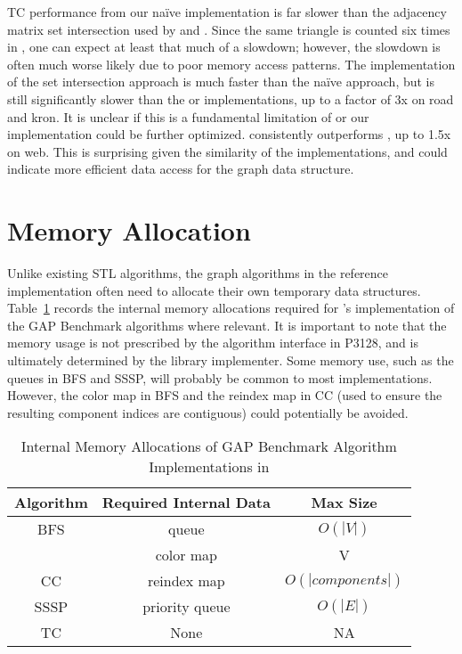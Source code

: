 TC performance from our na\"ive \bgl implementation
is far slower than the adjacency matrix set intersection used by \nwgraph
and \stdgraph.
Since the same triangle is counted six times in \bgl,
one can expect at least that much of a slowdown; however, the slowdown
is often much worse likely due to poor memory access patterns.
The \bgl implementation of the set intersection approach is much faster
than the na\"ive approach, but is still significantly slower than the
\nwgraph or \stdgraph implementations, up to a factor of 3x on road and kron.
It is unclear if this is a fundamental limitation of \bgl or our implementation could be
further optimized.
\stdgraph consistently outperforms \nwgraph, up to 1.5x on web.
This is surprising given the similarity of the implementations, and could indicate more
efficient data access for the \stdgraph graph data structure.

\section{Memory Allocation}

Unlike existing STL algorithms, the graph algorithms in the \stdgraph reference
implementation often need to allocate their own temporary data structures.
Table~\ref{tab:internalmem} records the internal memory allocations
required for \stdgraph's implementation of the GAP Benchmark algorithms
where relevant.
It is important to note that the memory usage is not prescribed
by the algorithm interface in P3128, and is ultimately determined by the
library implementer.
Some memory use, such as the queues in BFS and SSSP, will
probably be common to most implementations.
However, the color map in BFS and the reindex map in CC
(used to ensure the resulting component indices are contiguous)
could potentially be avoided.

\begin{table}[h!]
\centering
\begin{tabular}{| c | c | c |}
\hline
Algorithm & Required Internal Data & Max Size \\\hline
BFS       & queue          & $O(|V|)$ \\
          & color map      & V \\\hline
CC        & reindex map    & $O(|components|)$ \\\hline
SSSP      & priority queue & $O(|E|)$\\\hline
TC        & None           & N\/A\\
\hline
\end{tabular}
\caption{Internal Memory Allocations of GAP Benchmark Algorithm Implementations in \stdgraph}
\label{tab:internalmem}
\end{table}
